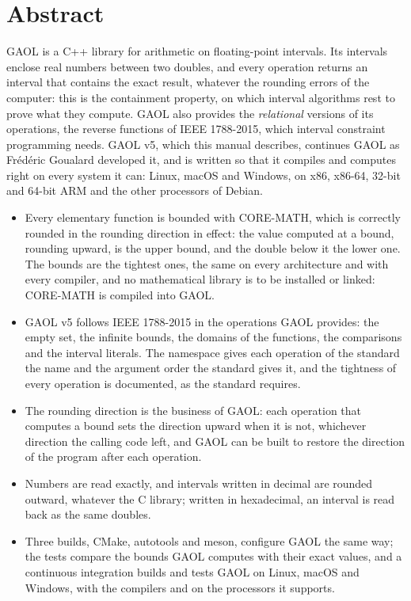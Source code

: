\documentclass[12pt,a4paper,twoside,openright]{book}
\begin{document}
\chapter*{Abstract}
\thispagestyle{plain}

GAOL is a C++ library for arithmetic on floating-point intervals. Its
intervals enclose real numbers between two doubles, and every operation
returns an interval that contains the exact result, whatever the rounding
errors of the computer: this is the containment property, on which interval
algorithms rest to prove what they compute. GAOL also provides the
\emph{relational} versions of its operations, the reverse functions of IEEE
1788-2015, which interval constraint programming needs. GAOL v5, which this
manual describes, continues GAOL as Fr\'ed\'eric Goualard developed it, and
is written so that it compiles and computes right on every system it can:
Linux, macOS and Windows, on x86, x86-64, 32-bit and 64-bit ARM and the other
processors of Debian.

\begin{itemize}
\item[$\bullet$] Every elementary function is bounded with CORE-MATH, which
  is correctly rounded in the rounding direction in effect: the value
  computed at a bound, rounding upward, is the upper bound, and the double
  below it the lower one. The bounds are the tightest ones, the same on every
  architecture and with every compiler, and no mathematical library is to be
  installed or linked: CORE-MATH is compiled into GAOL.
\item[$\bullet$] GAOL v5 follows IEEE 1788-2015 in the operations GAOL
  provides: the empty set, the infinite bounds, the domains of the functions,
  the comparisons and the interval literals. The namespace
   gives each operation of the standard the name and the
  argument order the standard gives it, and the tightness of every operation
  is documented, as the standard requires.
\item[$\bullet$] The rounding direction is the business of GAOL: each
  operation that computes a bound sets the direction upward when it is not,
  whichever direction the calling code left, and GAOL can be built to restore
  the direction of the program after each operation.
\item[$\bullet$] Numbers are read exactly, and intervals written in decimal
  are rounded outward, whatever the C library; written in hexadecimal, an
  interval is read back as the same doubles.
\item[$\bullet$] Three builds, CMake, autotools and meson, configure GAOL the
  same way; the tests compare the bounds GAOL computes with their exact
  values, and a continuous integration builds and tests GAOL on Linux, macOS
  and Windows, with the compilers and on the processors it supports.
\end{itemize}
\end{document}
